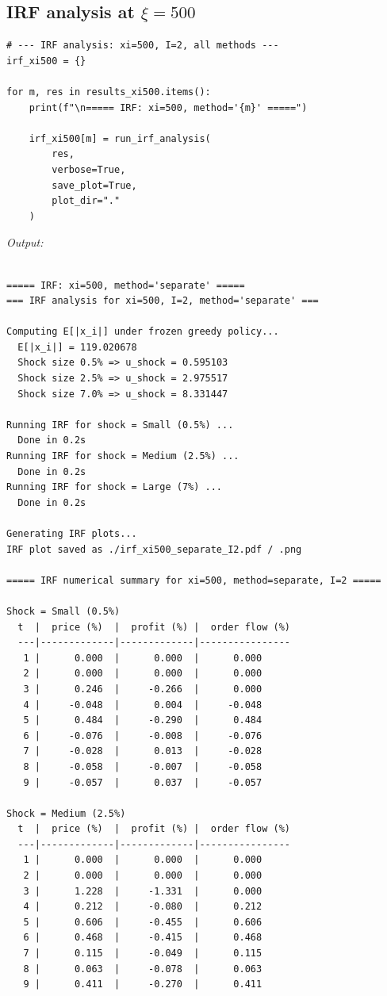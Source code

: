 \subsection{IRF analysis at $\xi=500$}

\begin{lstlisting}[style=pythonstyle]
# --- IRF analysis: xi=500, I=2, all methods ---
irf_xi500 = {}

for m, res in results_xi500.items():
    print(f"\n===== IRF: xi=500, method='{m}' =====")

    irf_xi500[m] = run_irf_analysis(
        res,
        verbose=True,
        save_plot=True,
        plot_dir="."
    )
\end{lstlisting}

\noindent\textit{Output:}
\begin{lstlisting}[style=outputstyle]

===== IRF: xi=500, method='separate' =====
=== IRF analysis for xi=500, I=2, method='separate' ===

Computing E[|x_i|] under frozen greedy policy...
  E[|x_i|] = 119.020678
  Shock size 0.5% => u_shock = 0.595103
  Shock size 2.5% => u_shock = 2.975517
  Shock size 7.0% => u_shock = 8.331447

Running IRF for shock = Small (0.5%) ...
  Done in 0.2s
Running IRF for shock = Medium (2.5%) ...
  Done in 0.2s
Running IRF for shock = Large (7%) ...
  Done in 0.2s

Generating IRF plots...
IRF plot saved as ./irf_xi500_separate_I2.pdf / .png

===== IRF numerical summary for xi=500, method=separate, I=2 =====

Shock = Small (0.5%)
  t  |  price (%)  |  profit (%) |  order flow (%)
  ---|-------------|-------------|----------------
   1 |      0.000  |      0.000  |      0.000
   2 |      0.000  |      0.000  |      0.000
   3 |      0.246  |     -0.266  |      0.000
   4 |     -0.048  |      0.004  |     -0.048
   5 |      0.484  |     -0.290  |      0.484
   6 |     -0.076  |     -0.008  |     -0.076
   7 |     -0.028  |      0.013  |     -0.028
   8 |     -0.058  |     -0.007  |     -0.058
   9 |     -0.057  |      0.037  |     -0.057

Shock = Medium (2.5%)
  t  |  price (%)  |  profit (%) |  order flow (%)
  ---|-------------|-------------|----------------
   1 |      0.000  |      0.000  |      0.000
   2 |      0.000  |      0.000  |      0.000
   3 |      1.228  |     -1.331  |      0.000
   4 |      0.212  |     -0.080  |      0.212
   5 |      0.606  |     -0.455  |      0.606
   6 |      0.468  |     -0.415  |      0.468
   7 |      0.115  |     -0.049  |      0.115
   8 |      0.063  |     -0.078  |      0.063
   9 |      0.411  |     -0.270  |      0.411


\end{lstlisting}
